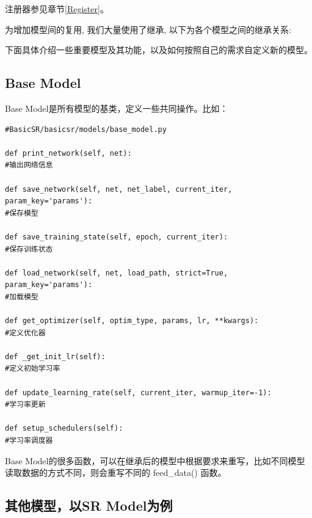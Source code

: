 \documentclass[../main.tex]{subfiles}
\begin{document}
\begin{note} %
	注册器参见章节\ref{Register}。
\end{note}

为增加模型间的复用, 我们大量使用了继承, 以下为各个模型之间的继承关系:


下面具体介绍一些重要模型及其功能，以及如何按照自己的需求自定义新的模型。

\subsection{Base Model}
Base Model是所有模型的基类，定义一些共同操作。比如：


\begin{verbatim}
#BasicSR/basicsr/models/base_model.py

def print_network(self, net):
#输出网络信息

def save_network(self, net, net_label, current_iter, param_key='params'):
#保存模型

def save_training_state(self, epoch, current_iter):
#保存训练状态

def load_network(self, net, load_path, strict=True, param_key='params'):
#加载模型

def get_optimizer(self, optim_type, params, lr, **kwargs):
#定义优化器

def _get_init_lr(self):
#定义初始学习率

def update_learning_rate(self, current_iter, warmup_iter=-1):
#学习率更新

def setup_schedulers(self):
#学习率调度器
\end{verbatim}

\begin{hl} %
Base Model的很多函数，可以在继承后的模型中根据要求来重写，比如不同模型读取数据的方式不同，则会重写不同的 feed\_data() 函数。
\end{hl}

\subsection{其他模型，以SR Model为例}\label{Model:SR Model}
\end{document}
